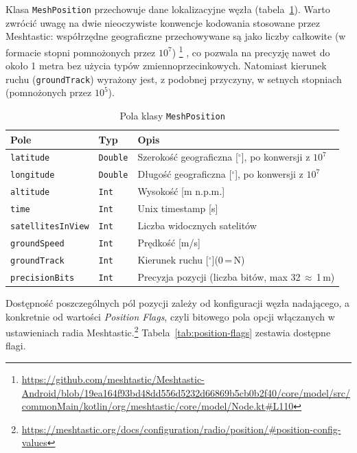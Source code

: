 Klasa \texttt{MeshPosition} przechowuje dane lokalizacyjne węzła
(tabela~\ref{tab:meshposition}). Warto zwrócić uwagę na dwie nieoczywiste konwencje
kodowania stosowane przez Meshtastic: współrzędne geograficzne przechowywane są jako liczby
całkowite (w formacie stopni pomnożonych przez $10^7$) 
\footnote{\url{https://github.com/meshtastic/Meshtastic-Android/blob/19ea164f93bd48dd556d5232d66869b5cb0b2f40/core/model/src/commonMain/kotlin/org/meshtastic/core/model/Node.kt\#L110}} ,
co pozwala na precyzję nawet do około 1 metra bez użycia typów zmiennoprzecinkowych. Natomiast kierunek ruchu (\texttt{groundTrack}) wyrażony jest, z podobnej przyczyny, w setnych stopniach (pomnożonych przez $10^5$).

\begin{table}[!h]
    \caption{Pola klasy \texttt{MeshPosition}}
    \label{tab:meshposition}
    \centering
    \begin{tabular}{|l|l|p{6.5cm}|}
        \hline
        \textbf{Pole} & \textbf{Typ} & \textbf{Opis} \\
        \hline
        \texttt{latitude}        & \texttt{Double} & Szerokość geograficzna [${}^\circ$], po konwersji z $10^7$ \\
        \texttt{longitude}       & \texttt{Double} & Długość geograficzna [${}^\circ$], po konwersji z $10^7$ \\
        \texttt{altitude}        & \texttt{Int}    & Wysokość [m n.p.m.] \\
        \texttt{time}            & \texttt{Int}    & Unix timestamp [s] \\
        \texttt{satellitesInView}& \texttt{Int}    & Liczba widocznych satelitów \\
        \texttt{groundSpeed}     & \texttt{Int}    & Prędkość [m/s] \\
        \texttt{groundTrack}     & \texttt{Int}    & Kierunek ruchu [${}^\circ$](0\,=\,N) \\
        \texttt{precisionBits}   & \texttt{Int}    & Precyzja pozycji (liczba bitów, max 32\,$\approx$\,1\,m) \\
        \hline
    \end{tabular}
\end{table}

Dostępność poszczególnych pól pozycji zależy od konfiguracji węzła nadającego, a konkretnie
od wartości \textit{Position Flags}, czyli bitowego pola opcji włączanych w ustawieniach
radia Meshtastic.\footnote{\url{https://meshtastic.org/docs/configuration/radio/position/\#position-config-values}}
Tabela~\ref{tab:position-flags} zestawia dostępne flagi.

